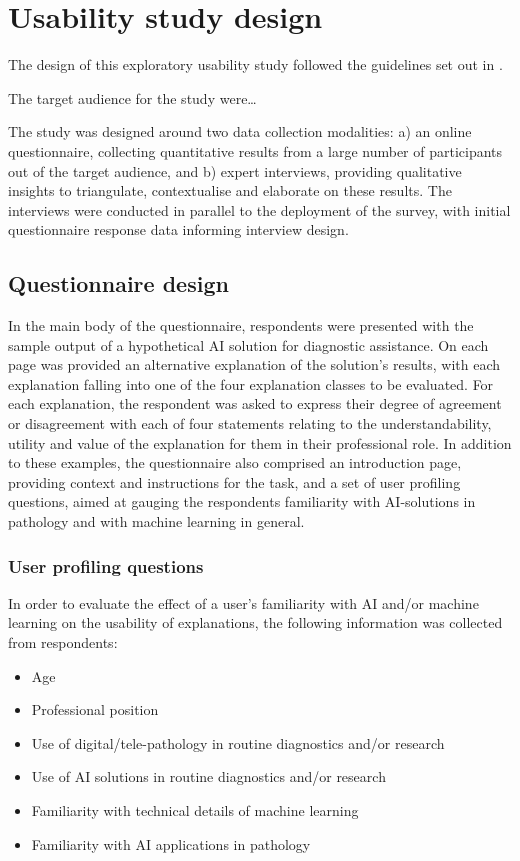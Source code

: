 \section{Usability study design}
\label{sec:CaseStudyDesign}

The design of this exploratory usability study followed the guidelines set out in \cite{runeson_guidelines_2008}.

The target audience for the study were\dots

The study was designed around two data collection modalities: a) an online questionnaire, collecting quantitative results from a large number of participants out of the target audience, and b) expert interviews, providing qualitative insights to triangulate, contextualise and elaborate on these results. The interviews were conducted in parallel to the deployment of the survey, with initial questionnaire response data informing interview design.

\subsection{Questionnaire design}
 In the main body of the questionnaire, respondents were presented with the sample output of a hypothetical AI solution for diagnostic assistance. On each page was provided an alternative explanation of the solution's results, with each explanation falling into one of the four explanation classes to be evaluated. For each explanation, the respondent was asked to express their degree of agreement or disagreement with each of four statements relating to the understandability, utility and value of the explanation for them in their professional role. In addition to these examples, the questionnaire also comprised an introduction page, providing context and instructions for the task, and a set of user profiling questions, aimed at gauging the respondents familiarity with AI-solutions in pathology and with machine learning in general.
 
 \subsubsection{User profiling questions}
In order to evaluate the effect of a user's familiarity with AI and/or machine learning on the usability of explanations, the following information was collected from respondents:

\begin{itemize}
    \item Age
    \item Professional position
    \item Use of digital/tele-pathology in routine diagnostics and/or research
    \item Use of AI solutions in routine diagnostics and/or research
    \item Familiarity with technical details of machine learning
    \item Familiarity with AI applications in pathology
\end{itemize}



